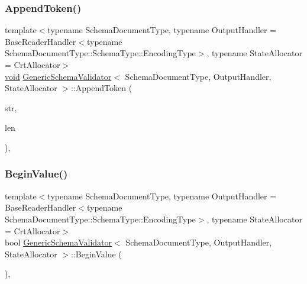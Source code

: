 \subsubsection{\texorpdfstring{Append\+Token()}{AppendToken()}}
{\footnotesize\ttfamily template$<$typename Schema\+Document\+Type, typename Output\+Handler = Base\+Reader\+Handler$<$typename Schema\+Document\+Type\+::\+Schema\+Type\+::\+Encoding\+Type$>$, typename State\+Allocator = Crt\+Allocator$>$ \\
\hyperlink{imgui__impl__opengl3__loader_8h_ac668e7cffd9e2e9cfee428b9b2f34fa7}{void} \hyperlink{classGenericSchemaValidator}{Generic\+Schema\+Validator}$<$ Schema\+Document\+Type, Output\+Handler, State\+Allocator $>$\+::Append\+Token (\begin{DoxyParamCaption}\item[{const \hyperlink{classGenericSchemaValidator_a8b7dab5a0cda9cc0adaefb4401d260c1}{Ch} $\ast$}]{str,  }\item[{\hyperlink{rapidjson_8h_a5ed6e6e67250fadbd041127e6386dcb5}{Size\+Type}}]{len }\end{DoxyParamCaption})\hspace{0.3cm}{\ttfamily [inline]}, {\ttfamily [private]}}

\mbox{\label{classGenericSchemaValidator_a3a701bdd690fa33db03431c8336a7653}} 
\subsubsection{\texorpdfstring{Begin\+Value()}{BeginValue()}}
{\footnotesize\ttfamily template$<$typename Schema\+Document\+Type, typename Output\+Handler = Base\+Reader\+Handler$<$typename Schema\+Document\+Type\+::\+Schema\+Type\+::\+Encoding\+Type$>$, typename State\+Allocator = Crt\+Allocator$>$ \\
bool \hyperlink{classGenericSchemaValidator}{Generic\+Schema\+Validator}$<$ Schema\+Document\+Type, Output\+Handler, State\+Allocator $>$\+::Begin\+Value (\begin{DoxyParamCaption}{ }\end{DoxyParamCaption})\hspace{0.3cm}{\ttfamily [inline]}, {\ttfamily [private]}}

\mbox{\label{classGenericSchemaValidator_a15a12306bc14f16357b4f2edea8396b7}} 
